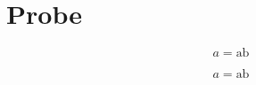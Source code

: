 \chapter{Probe}\label{c99}
\begin{equation}\label{c99.eq.core}a=\text{ab}\end{equation}
\begin{vertiefung}[id=c99.v1,titel={T},wozu={W},voraussetzung={V},zurueck={Z}]
\begin{equation}\label{c99.eq.deep}a=\text{ab}\end{equation}
\end{vertiefung}
